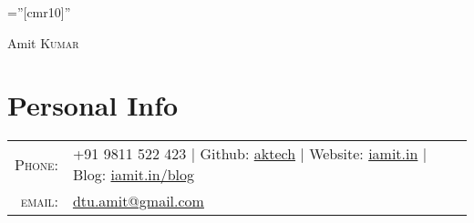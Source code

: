 \documentclass[a4paper,10pt]{article}
\begin{document}

\pagestyle{empty} %

\font\fb=''[cmr10]'' %

\par{\centering
		{\Huge Amit \textsc{Kumar}
	}\bigskip\par}

\section{Personal Info}

\begin{tabular}{rl}
    \textsc{Phone:}     & +91 9811 522 423  |  Github: \href{https://github.com/aktech}{aktech} | Website: \href{http://iamit.in}{iamit.in} | Blog: \href{http://iamit.in/blog}{iamit.in/blog}\\
    \textsc{email:}     & \href{mailto:dtu.amit@gmail.com}{dtu.amit@gmail.com} 
\end{tabular}

\end{document}

